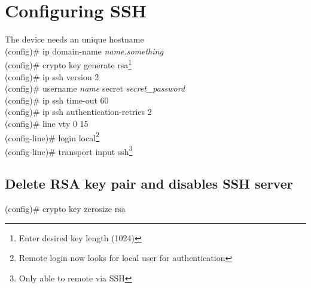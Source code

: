 \section{Configuring SSH}
\textrm{The device needs an unique hostname}\\
(config)\# ip domain-name \textit{name.something}\\
(config)\# crypto key generate rsa\footnote{Enter desired key length (1024)}\\
(config)\# ip ssh version 2\\
(config)\# username \textit{name} secret \textit{secret\_password}\vspace{11pt}\\
(config)\# ip ssh time-out 60\\
(config)\# ip ssh authentication-retries 2\vspace{11pt}\\
(config)\# line vty 0 15\\
(config-line)\# login local\footnote{Remote login now looks for local user for authentication}\\
(config-line)\# transport input ssh\footnote{Only able to remote via SSH}

\subsection{Delete RSA key pair and disables SSH server}
(config)\# crypto key zerosize rsa